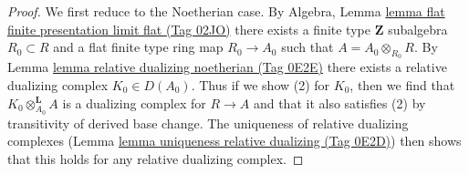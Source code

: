 \documentclass{amsart}
\theoremstyle{plain}
\theoremstyle{definition}
\theoremstyle{remark}
\numberwithin{equation}{subsection}
\begin{document}
\begin{proof}
We first reduce to the Noetherian case. By
Algebra, Lemma \href{https://stacks.math.columbia.edu/tag/02JO}{lemma flat finite presentation limit flat (Tag 02JO)}
there exists a finite type $\mathbf{Z}$ subalgebra $R_0 \subset R$
and a flat finite type ring map $R_0 \to A_0$ such that
$A = A_0 \otimes_{R_0} R$. By Lemma \href{https://stacks.math.columbia.edu/tag/0E2E}{lemma relative dualizing noetherian (Tag 0E2E)}
there exists a relative
dualizing complex $K_0 \in D(A_0)$.
Thus if we show (2) for $K_0$, then we find that
$K_0 \otimes_{A_0}^\mathbf{L} A$ is
a dualizing complex for $R \to A$ and that it also satisfies (2)
by transitivity of derived base change.
The uniqueness of relative dualizing complexes
(Lemma \href{https://stacks.math.columbia.edu/tag/0E2D}{lemma uniqueness relative dualizing (Tag 0E2D)})
then shows that this holds for
any relative dualizing complex.


\end{proof}
\end{document}
